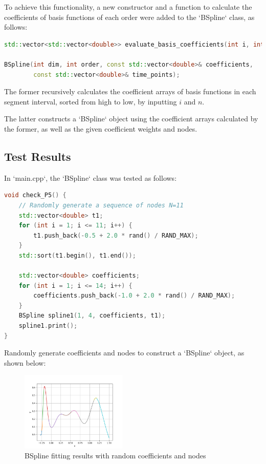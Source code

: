 \documentclass[a4paper]{article}
\begin{document}
To achieve this functionality, a new constructor and a function to calculate the coefficients of basis functions of each order were added to the `BSpline` class, as follows:
\begin{lstlisting}[language=C++]
std::vector<std::vector<double>> evaluate_basis_coefficients(int i, int k) const;

BSpline(int dim, int order, const std::vector<double>& coefficients, 
        const std::vector<double>& time_points);
\end{lstlisting}
The former recursively calculates the coefficient arrays of basis functions in each segment interval, sorted from high to low, by inputting \(i\) and \(n\).

The latter constructs a `BSpline` object using the coefficient arrays calculated by the former, as well as the given coefficient weights and nodes.

\subsection{Test Results}

In `main.cpp`, the `BSpline` class was tested as follows:
\begin{lstlisting}[language=C++]
void check_P5() {
    // Randomly generate a sequence of nodes N=11
    std::vector<double> t1;
    for (int i = 1; i <= 11; i++) {
        t1.push_back(-0.5 + 2.0 * rand() / RAND_MAX);
    }
    std::sort(t1.begin(), t1.end()); 

    std::vector<double> coefficients;
    for (int i = 1; i <= 14; i++) {
        coefficients.push_back(-1.0 + 2.0 * rand() / RAND_MAX);
    }
    BSpline spline1(1, 4, coefficients, t1);
    spline1.print();
}
\end{lstlisting}
Randomly generate coefficients and nodes to construct a `BSpline` object, as shown below:

\begin{figure}[H]
    \centering
    \includegraphics[width=0.45\textwidth]{./figure/check/P5_bspline.png}
    \caption{BSpline fitting results with random coefficients and nodes}
\end{figure}
\end{document}
